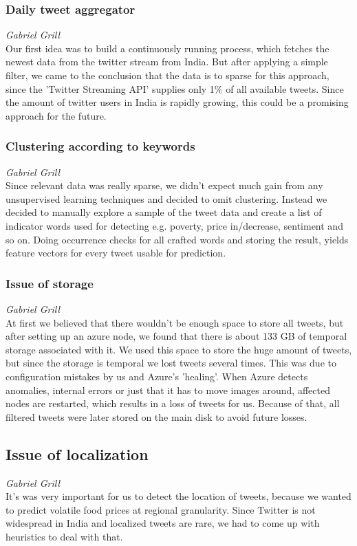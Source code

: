 \subsubsection*{Daily tweet aggregator}
\emph{Gabriel Grill} \\
Our first idea was to build a continuously running process, which fetches the newest data from the twitter stream from India. But after applying a simple filter, we came to the conclusion that the data is to sparse for this approach, since the 'Twitter Streaming API' supplies only 1\% of all available tweets. Since the amount of twitter users in India is rapidly growing, this could be a promising approach for the future.

\subsubsection*{Clustering according to keywords}
\emph{Gabriel Grill} \\
Since relevant data was really sparse, we didn't expect much gain from any unsupervised learning techniques and decided to omit clustering. Instead we decided to manually explore a sample of the tweet data and create a list of indicator words used for detecting e.g. poverty, price in/decrease, sentiment and so on. Doing occurrence checks for all crafted words and storing the result, yields feature vectors for every tweet usable for prediction.

\subsubsection*{Issue of storage}
\emph{Gabriel Grill} \\
At first we believed that there wouldn't be enough space to store all tweets, but after setting up an azure node, we found that there is about 133 GB of temporal storage associated with it. We used this space to store the huge amount of tweets, but since the storage is temporal we lost tweets several times. This was due to configuration mistakes by us and Azure's 'healing'. When Azure detects anomalies, internal errors or just that it has to move images around, affected nodes are restarted, which results in a loss of tweets for us. Because of that, all filtered tweets were later stored on the main disk to avoid future losses.

\subsection*{Issue of localization}
\emph{Gabriel Grill} \\
It's was very important for us to detect the location of tweets, because we wanted to predict volatile food prices at regional granularity. Since Twitter is not widespread in India and localized tweets are rare, we had to come up with heuristics to deal with that.

